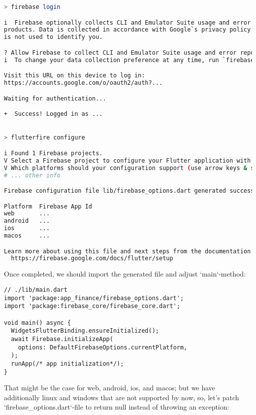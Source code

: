 \begin{lstlisting}[language=bash]
> firebase login

i  Firebase optionally collects CLI and Emulator Suite usage and error reporting information to help improve our 
products. Data is collected in accordance with Google`s privacy policy (https://policies.google.com/privacy) and 
is not used to identify you.

? Allow Firebase to collect CLI and Emulator Suite usage and error reporting information? Yes
i  To change your data collection preference at any time, run `firebase logout` and log in again.

Visit this URL on this device to log in:
https://accounts.google.com/o/oauth2/auth?...

Waiting for authentication...

+  Success! Logged in as ...


> flutterfire configure

i Found 1 Firebase projects.
V Select a Firebase project to configure your Flutter application with  fingram-9030a (Fingram)
V Which platforms should your configuration support (use arrow keys & space to select)? - macos, web, ios, android
# ... other info

Firebase configuration file lib/firebase_options.dart generated successfully with the following Firebase apps:

Platform  Firebase App Id
web       ...
android   ...
ios       ...
macos     ...

Learn more about using this file and next steps from the documentation:
  https://firebase.google.com/docs/flutter/setup
\end{lstlisting}

\noindent Once completed, we should import the generated file and adjust `main`-method:

\begin{lstlisting}
// ./lib/main.dart
import 'package:app_finance/firebase_options.dart';
import 'package:firebase_core/firebase_core.dart';

void main() async {
  WidgetsFlutterBinding.ensureInitialized();
  await Firebase.initializeApp(
    options: DefaultFirebaseOptions.currentPlatform,
  );
  runApp(/* app initialization*/);
}
\end{lstlisting}

\noindent That might be the case for web, android, ios, and macos; but we have additionally linux and windows that are 
not supported by now, so, let's patch `firebase\_options.dart`-file to return null instead of throwing an exception:

